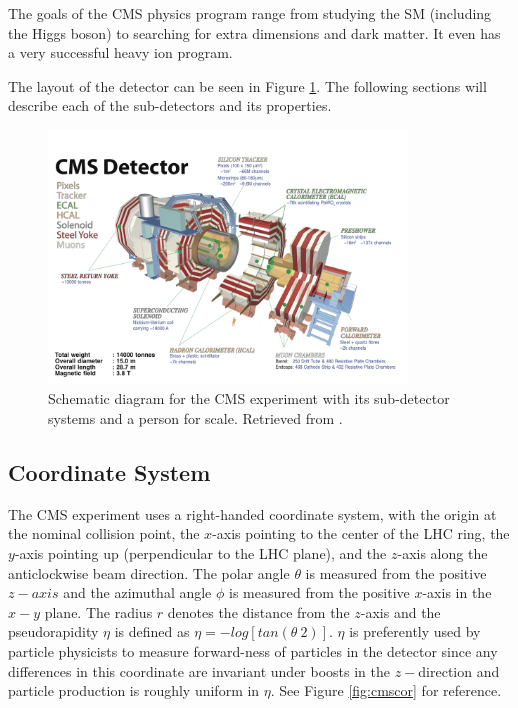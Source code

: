 The goals of the CMS physics program range from studying the SM (including the Higgs boson) to searching for extra dimensions and dark matter. It even has a very successful heavy ion program.

The layout of the detector can be seen in Figure \ref{fig:cmsdia}. The following sections will describe each of the sub-detectors and its properties.

 \begin{figure}[H]
 	\centering
 	\includegraphics[width=0.85\textwidth]{figures/cms_whole.png}
 	\singlespace
 	\caption{Schematic diagram for the CMS experiment with its sub-detector systems and a person for scale. Retrieved from \cite{CMS-schematic}.}
 	\label{fig:cmsdia}
 \end{figure}

 \subsection{Coordinate System}

 The CMS experiment uses a right-handed coordinate system, with the origin at the nominal collision point, the $x$-axis pointing to the center of the LHC ring, the $y$-axis pointing up (perpendicular to the LHC plane), and the $z$-axis along the anticlockwise beam direction. The polar angle $\theta$ is measured from the positive $z-axis$ and the azimuthal angle $\phi$ is measured from the positive $x$-axis in the $x-y$ plane. The radius $r$ denotes the distance from the $z$-axis and the pseudorapidity $\eta$ is defined as $\eta=-log[tan(\theta \ 2)]$. $\eta$ is preferently used by particle physicists to measure forward-ness of particles in the detector since any differences in this coordinate are invariant under boosts in the $z-$direction and particle production is roughly uniform in $\eta$. See Figure \ref{fig:cmscor} for reference.

